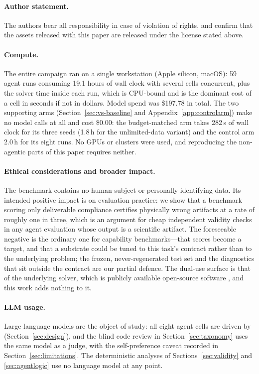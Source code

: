 \paragraph{Author statement.}
The authors bear all responsibility in case of violation of rights, and confirm
that the assets released with this paper are released under the license stated
above.

\paragraph{Compute.}
The entire campaign ran on a single workstation (Apple silicon, macOS): 59 agent
runs consuming 19.1 hours of wall clock with several cells concurrent, plus the
solver time inside each run, which is CPU-bound and is the dominant cost of a
cell in seconds if not in dollars. Model spend was \$197.78 in total. The two
supporting arms (Section~\ref{sec:vs-baseline} and
Appendix~\ref{app:controlarm}) make no model calls at all and cost \$0.00: the
budget-matched \Lzero{} arm takes 282\,s of wall clock for its three seeds
(1.8\,h for the unlimited-data variant) and the control arm 2.0\,h for its
eight runs. No GPUs or clusters were used, and reproducing the non-agentic
parts of this paper requires neither.

\paragraph{Ethical considerations and broader impact.}
The benchmark contains no human-subject or personally identifying data. Its
intended positive impact is on evaluation practice: we show that a benchmark
scoring only deliverable compliance certifies physically wrong artifacts at a
rate of roughly one in three, which is an argument for cheap independent
validity checks in any agent evaluation whose output is a scientific artifact.
The foreseeable negative is the ordinary one for capability benchmarks---that
scores become a target, and that a substrate could be tuned to this task's
contract rather than to the underlying problem; the frozen, never-regenerated
test set and the diagnostics that sit outside the contract are our partial
defence. The dual-use surface is that of the underlying solver, which is
publicly available open-source software \citep{hansen2024tokamaker}, and this
work adds nothing to it.

\paragraph{LLM usage.}
Large language models are the object of study: all eight agent cells are driven
by  (Section~\ref{sec:design}), and the blind code review in
Section~\ref{sec:taxonomy} uses the same model as a judge, with the
self-preference caveat recorded in Section~\ref{sec:limitations}. The
deterministic analyses of Sections~\ref{sec:validity} and \ref{sec:agentlogic}
use no language model at any point.

